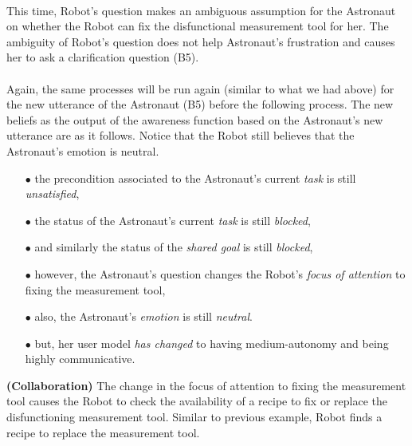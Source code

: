 \noindent{}\\

This time, Robot's question makes an ambiguous assumption for the Astronaut on
whether the Robot can fix the disfunctional measurement tool for her. The
ambiguity of Robot's question does not help Astronaut's frustration and causes
her to ask a clarification question (B5).\\

\noindent{}\\

Again, the same processes will be run again (similar to what we had above) for
the new utterance of the Astronaut (B5) before the following process. The new
beliefs as the output of the awareness function based on the Astronaut's new
utterance are as it follows. Notice that the Robot still believes that the
Astronaut's emotion is neutral.

\begin{itemize}
  \item[$\bullet$] the precondition associated to the Astronaut's current
  \textit{task} is still \textit{unsatisfied},
  \item[$\bullet$] the status of the Astronaut's current \textit{task} is still
  \textit{blocked},
  \item[$\bullet$] and similarly the status of the \textit{shared goal} is
  still \textit{blocked},
  \item[$\bullet$] however, the Astronaut's question changes the Robot's
  \textit{focus of attention} to fixing the measurement tool,
  \item[$\bullet$] also, the Astronaut's \textit{emotion} is still
  \textit{neutral}.
  \item[$\bullet$] but, her user model \textit{has changed} to having
  medium-autonomy and being highly communicative.
\end{itemize}

\noindent\textbf{(Collaboration)} The change in the focus of attention to fixing
the measurement tool causes the Robot to check the availability of a recipe to
fix or replace the disfunctioning measurement tool. Similar to previous
example, Robot finds a recipe to replace the measurement tool.\\

